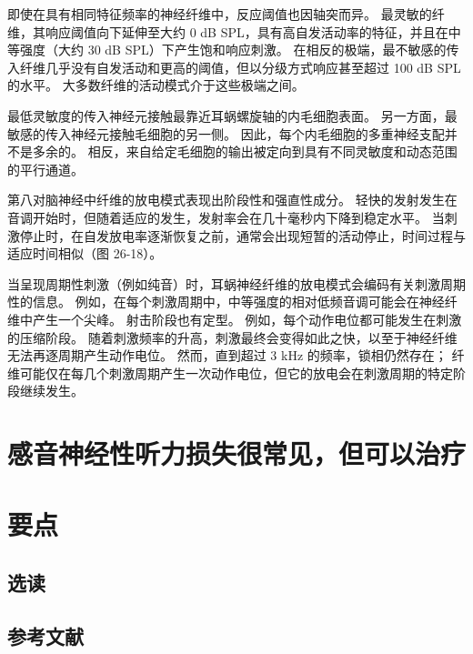 即使在具有相同特征频率的神经纤维中，反应阈值也因轴突而异。 最灵敏的纤维，其响应阈值向下延伸至大约 0 dB SPL，具有高自发活动率的特征，并且在中等强度（大约 30 dB SPL）下产生饱和响应刺激。 在相反的极端，最不敏感的传入纤维几乎没有自发活动和更高的阈值，但以分级方式响应甚至超过 100 dB SPL 的水平。 大多数纤维的活动模式介于这些极端之间。

最低灵敏度的传入神经元接触最靠近耳蜗螺旋轴的内毛细胞表面。 另一方面，最敏感的传入神经元接触毛细胞的另一侧。 因此，每个内毛细胞的多重神经支配并不是多余的。 相反，来自给定毛细胞的输出被定向到具有不同灵敏度和动态范围的平行通道。

第八对脑神经中纤维的放电模式表现出阶段性和强直性成分。 轻快的发射发生在音调开始时，但随着适应的发生，发射率会在几十毫秒内下降到稳定水平。 当刺激停止时，在自发放电率逐渐恢复之前，通常会出现短暂的活动停止，时间过程与适应时间相似（图 26-18）。

当呈现周期性刺激（例如纯音）时，耳蜗神经纤维的放电模式会编码有关刺激周期性的信息。 例如，在每个刺激周期中，中等强度的相对低频音调可能会在神经纤维中产生一个尖峰。 射击阶段也有定型。 例如，每个动作电位都可能发生在刺激的压缩阶段。 随着刺激频率的升高，刺激最终会变得如此之快，以至于神经纤维无法再逐周期产生动作电位。 然而，直到超过 3 kHz 的频率，锁相仍然存在； 纤维可能仅在每几个刺激周期产生一次动作电位，但它的放电会在刺激周期的特定阶段继续发生。



\section{感音神经性听力损失很常见，但可以治疗}

\section{要点}
\subsection{选读}
\subsection{参考文献}